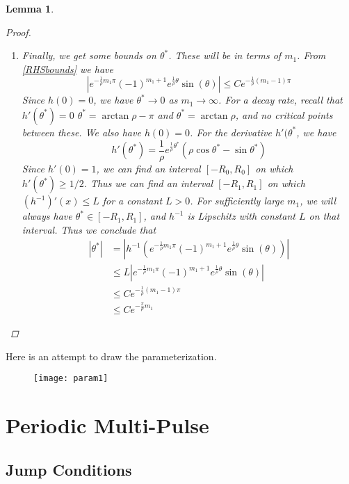 \documentclass[12pt]{article}
\newtheorem{lemma}{Lemma}
\begin{document}
\begin{lemma}
\begin{proof}
\begin{enumerate}
\begin{enumerate}
		\item Finally, we get some bounds on $\theta^*$. These will be in terms of $m_1$. From \eqref{RHSbounds} we have
		\[
		|e^{ -\frac{1}{\rho} m_1 \pi } (-1)^{m_1 + 1}  e^{ \frac{1}{\rho} \theta } \sin(\theta)| \leq C e^{ -\frac{1}{\rho}(m_1 - 1) \pi }
		\]
		Since $h(0) = 0$, we have $\theta^* \rightarrow 0$ as $m_1 \rightarrow \infty$. For a decay rate, recall that $h'(\theta^*) = 0$  $\theta^* = \arctan{\rho} - \pi$ and $\theta^* = \arctan{\rho}$, and no critical points between these. We also have $h(0) = 0$. For the derivative $h'(\theta^*$, we have
		\[
		h'(\theta^*) = \frac{1}{\rho}e^{\frac{1}{\rho}\theta^*}(\rho \cos \theta^* - \sin \theta^*)
		\]
		Since $h'(0) = 1$, we can find an interval $[-R_0,R_0]$ on which $h'(\theta^*) \geq 1/2$. Thus we can find an interval $[-R_1, R_1]$ on which $(h^{-1})'(x) \leq L$ for a constant $L > 0$. For sufficiently large $m_1$, we will always have $\theta^* \in [-R_1, R_1]$, and $h^{-1}$ is Lipschitz with constant $L$ on that interval. Thus we conclude that
		\begin{align*}
		|\theta^*| &= | h^{-1}(e^{ -\frac{1}{\rho} m_1 \pi } (-1)^{m_1 + 1}  e^{ \frac{1}{\rho} \theta } \sin(\theta)) | \\
		&\leq L |e^{ -\frac{1}{\rho} m_1 \pi } (-1)^{m_1 + 1}  e^{ \frac{1}{\rho} \theta } \sin(\theta)| \\
		&\leq C e^{ -\frac{1}{\rho}(m_1 - 1) \pi } \\
		&\leq C e^{ -\frac{\pi}{\rho} m_1 }
		\end{align*}

	\end{enumerate}
\end{enumerate}

\end{proof}
\end{lemma}

Here is an attempt to draw the parameterization.

\begin{figure}[H]
\begin{center}
\texttt{[image: param1]}
\end{center}
\end{figure}

\section{Periodic Multi-Pulse}

\subsection{Jump Conditions}
\end{document}
